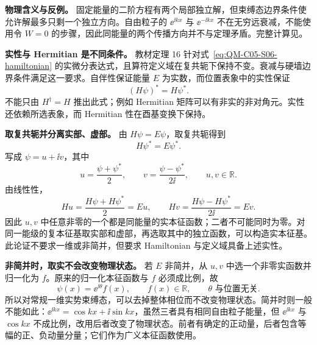 \textbf{物理含义与反例。}
固定能量的二阶方程有两个局部独立解，但束缚态边界条件使允许解最多只剩一个独立方向。自由粒子的 $\ee^{\ii kx}$ 与 $\ee^{-\ii kx}$ 不在无穷远衰减，不能使用令 $W=0$ 的步骤，因此同能量的两个传播方向并不与定理矛盾。完整计算见。



\textbf{实性与 Hermitian 是不同条件。}
教材定理 16 针对式~\eqref{eq:QM-C05-S06-hamiltonian} 的实微分表达式，且算符定义域在复共轭下保持不变。衰减与硬墙边界条件满足这一要求。自伴性保证能量 $E$ 为实数，而位置表象中的实性保证
\begin{equation}
  (H\psi)^*=H\psi^*.
\end{equation}
不能只由 $H^\dagger=H$ 推出此式；例如 Hermitian 矩阵可以有非实的非对角元。实性还依赖所选表象，而 Hermitian 性在酉基变换下保持。

\textbf{取复共轭并分离实部、虚部。}
由 $H\psi=E\psi$，取复共轭得到
\begin{equation}
  H\psi^*=E\psi^*.
\end{equation}
写成 $\psi=u+\ii v$，其中
\begin{equation}
  u=\frac{\psi+\psi^*}{2},\qquad
  v=\frac{\psi-\psi^*}{2\ii},\qquad u,v\in\mathbb R.
\end{equation}
由线性性，
\begin{equation}
  Hu=\frac{H\psi+H\psi^*}{2}=Eu,
  \qquad
  Hv=\frac{H\psi-H\psi^*}{2\ii}=Ev.
  \label{eq:QM-C05-S06-real-imag-eigenfunctions}
\end{equation}
因此 $u,v$ 中任意非零的一个都是同能量的实本征函数；二者不可能同时为零。对同一能级的复本征基取实部和虚部，再选取其中的独立函数，可以构造实本征基。此论证不要求一维或非简并，但要求 Hamiltonian 与定义域具备上述实性。

\textbf{非简并时，取实不会改变物理状态。}
若 $E$ 非简并，从 $u,v$ 中选一个非零实函数并归一化为 $f$。原来的归一化本征函数与 $f$ 必须成比例，故
\begin{equation}
  \boxed{\psi(x)=\ee^{\ii\theta}f(x),\qquad f(x)\in\mathbb R},
  \qquad \theta\text{ 与位置无关}.
  \label{eq:QM-C05-S06-real-up-to-phase}
\end{equation}
所以对常规一维实势束缚态，可以去掉整体相位而不改变物理状态。简并时则一般不能如此：$\ee^{\ii kx}=\cos kx+\ii\sin kx$，虽然三者具有相同自由粒子能量，但 $\ee^{\ii kx}$ 与 $\cos kx$ 不成比例，改用后者改变了物理状态。前者有确定的正动量，后者包含等幅的正、负动量分量；它们作为广义本征函数使用。

